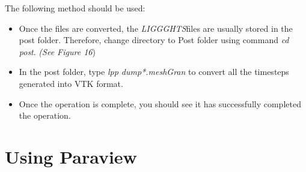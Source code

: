 \documentclass{tufte-book} %
\newcommand{\Li}{\textit{LIGGGHTS}}
\begin{document}
 The following method should be used:
 \begin{itemize}
 \item Once the files are converted, the \Li files are usually stored in the post folder. Therefore, change directory to Post folder using command \textit{\emph{cd post}}. \textit{(See Figure 16})
 \item In the post folder, type \textit{\emph{lpp dump*.meshGran }} to convert all the timesteps generated into VTK format.
 \item Once the operation is complete, you should see it has successfully completed the operation.
 \end{itemize}
\section[Using Paraview]{Using Paraview }
 
\end{document}
